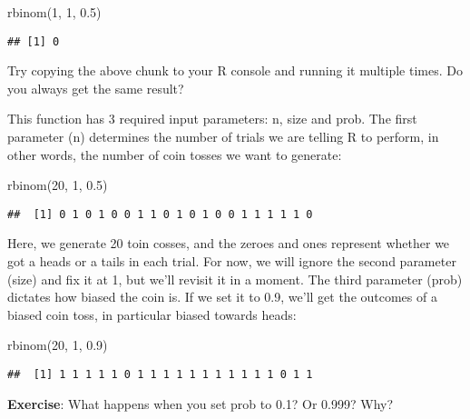 \documentclass[
]{book}
\newenvironment{Shaded}{\begin{snugshade}}{\end{snugshade}}
\newcommand{\DecValTok}[1]{\textcolor[rgb]{0.00,0.00,0.81}{#1}}
\newcommand{\FloatTok}[1]{\textcolor[rgb]{0.00,0.00,0.81}{#1}}
\newcommand{\FunctionTok}[1]{\textcolor[rgb]{0.00,0.00,0.00}{#1}}
\newcommand{\NormalTok}[1]{#1}
\begin{document}
\begin{Shaded}
\begin{Highlighting}[]
\FunctionTok{rbinom}\NormalTok{(}\DecValTok{1}\NormalTok{, }\DecValTok{1}\NormalTok{, }\FloatTok{0.5}\NormalTok{)}
\end{Highlighting}
\end{Shaded}

\begin{verbatim}
## [1] 0
\end{verbatim}

Try copying the above chunk to your R console and running it multiple times. Do you always get the same result?

This function has 3 required input parameters: n, size and prob. The first parameter (n) determines the number of trials we are telling R to perform, in other words, the number of coin tosses we want to generate:

\begin{Shaded}
\begin{Highlighting}[]
\FunctionTok{rbinom}\NormalTok{(}\DecValTok{20}\NormalTok{, }\DecValTok{1}\NormalTok{, }\FloatTok{0.5}\NormalTok{)}
\end{Highlighting}
\end{Shaded}

\begin{verbatim}
##  [1] 0 1 0 1 0 0 1 1 0 1 0 1 0 0 1 1 1 1 1 0
\end{verbatim}

Here, we generate 20 toin cosses, and the zeroes and ones represent whether we got a heads or a tails in each trial. For now, we will ignore the second parameter (size) and fix it at 1, but we'll revisit it in a moment. The third parameter (prob) dictates how biased the coin is. If we set it to 0.9, we'll get the outcomes of a biased coin toss, in particular biased towards heads:

\begin{Shaded}
\begin{Highlighting}[]
\FunctionTok{rbinom}\NormalTok{(}\DecValTok{20}\NormalTok{, }\DecValTok{1}\NormalTok{, }\FloatTok{0.9}\NormalTok{)}
\end{Highlighting}
\end{Shaded}

\begin{verbatim}
##  [1] 1 1 1 1 1 0 1 1 1 1 1 1 1 1 1 1 1 0 1 1
\end{verbatim}

\textbf{Exercise}: What happens when you set prob to 0.1? Or 0.999? Why?
\end{document}
